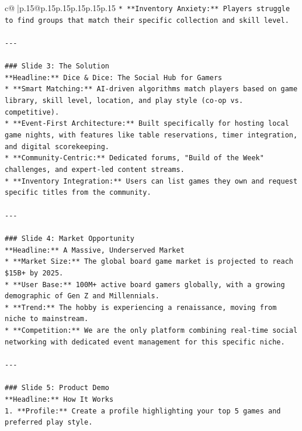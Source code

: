 \documentclass{article}
\begin{document}
{\begin{supertabular}{c@{$\;$}|p{.15\linewidth}@{}p{.15\linewidth}p{.15\linewidth}p{.15\linewidth}p{.15\linewidth}p{.15\linewidth}}
{{{\texttt{*   **Inventory Anxiety:** Players struggle to find groups that match their specific collection and skill level.} \\
\\ 
\texttt{{-}{-}{-}} \\
\\ 
\texttt{\#\#\# Slide 3: The Solution} \\
\texttt{**Headline:** Dice \& Dice: The Social Hub for Gamers} \\
\texttt{*   **Smart Matching:** AI{-}driven algorithms match players based on game library, skill level, location, and play style (co{-}op vs. competitive).} \\
\texttt{*   **Event{-}First Architecture:** Built specifically for hosting local game nights, with features like table reservations, timer integration, and digital scorekeeping.} \\
\texttt{*   **Community{-}Centric:** Dedicated forums, "Build of the Week" challenges, and expert{-}led content streams.} \\
\texttt{*   **Inventory Integration:** Users can list games they own and request specific titles from the community.} \\
\\ 
\texttt{{-}{-}{-}} \\
\\ 
\texttt{\#\#\# Slide 4: Market Opportunity} \\
\texttt{**Headline:** A Massive, Underserved Market} \\
\texttt{*   **Market Size:** The global board game market is projected to reach \$15B+ by 2025.} \\
\texttt{*   **User Base:** 100M+ active board gamers globally, with a growing demographic of Gen Z and Millennials.} \\
\texttt{*   **Trend:** The hobby is experiencing a renaissance, moving from niche to mainstream.} \\
\texttt{*   **Competition:** We are the only platform combining real{-}time social networking with dedicated event management for this specific niche.} \\
\\ 
\texttt{{-}{-}{-}} \\
\\ 
\texttt{\#\#\# Slide 5: Product Demo} \\
\texttt{**Headline:** How It Works} \\
\texttt{1.  **Profile:** Create a profile highlighting your top 5 games and preferred play style.} \\
}}}
\end{supertabular}}
\end{document}
